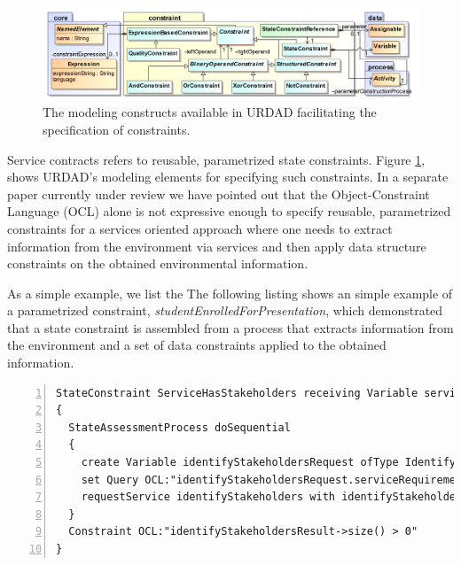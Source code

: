 \begin{figure}[Htbp]
  \centering
  \includegraphics{constraint}
  \caption{The modeling constructs available in URDAD facilitating the specification of constraints.}
  \label{fig:constraintModule}
\end{figure}

Service contracts refers to reusable, parametrized state constraints. Figure \ref{fig:constraintModule}, shows URDAD's modeling elements for specifying such constraints. In a separate paper currently under review we have pointed out that the Object-Constraint Language (OCL)\cite{_object_2010}  alone is not expressive enough to specify reusable, parametrized constraints for a services oriented approach where one needs to extract information from the environment via services and then apply data structure constraints on the obtained environmental information.

As a simple example, we list the 
The following listing shows an simple example of a parametrized constraint, \emph{studentEnrolledForPresentation}, which demonstrated that a state constraint is assembled from a process that extracts information from the environment and a set of data constraints applied to the obtained information.
\lstset{language=urdad,caption=Specifying a state constraint in the URDAD text grammar.,label=processTextSyntax}
\begin{lstlisting}[numbers=left,escapechar=|]
StateConstraint ServiceHasStakeholders receiving Variable serviceRequirements ofType _ServiceRequirements 
{
  StateAssessmentProcess doSequential 
  {
    create Variable identifyStakeholdersRequest ofType IdentifyStakeholdersRequest
    set Query OCL:"identifyStakeholdersRequest.serviceRequirements" equalTo Query OCL:"serviceRequirements"
    requestService identifyStakeholders with identifyStakeholdersRequest yielding Variable identifyStakeholdersResult ofType IdentifyStakeholdersResult
  }
  Constraint OCL:"identifyStakeholdersResult->size() > 0"
}
\end{lstlisting}

